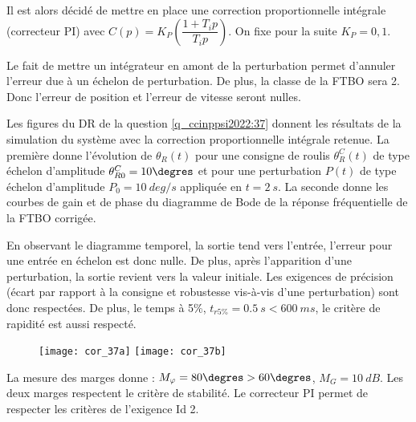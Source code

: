 Il est alors décidé de mettre en place une correction proportionnelle intégrale (correcteur PI)
avec $C(p) = K_P\left(\dfrac{1+T_i p}{T_i p}\right)$. On fixe pour la suite $K_P = 0,1$.

\ifprof
\begin{corrige}
Le fait de mettre un intégrateur en amont de la perturbation permet d’annuler l’erreur due à un échelon de perturbation.
De plus, la classe de la FTBO sera 2. Donc l’erreur de position et l’erreur de vitesse seront nulles.

\end{corrige}
\else
\fi

Les figures du DR de la question \ref{q_ccinppsi2022:37} donnent les résultats de la simulation du système avec la
correction proportionnelle intégrale retenue. La première donne l’évolution de $\theta_R(t)$ pour une
consigne de roulis $\theta_R^C(t)$ de type échelon d’amplitude $\theta_{R0}^C = 10\degres$ et pour une perturbation $P(t)$ de
type échelon d’amplitude $P_0 =\SI{10}{deg/s}$ appliquée en $t = \SI{2}{s}$. La seconde donne les courbes
de gain et de phase du diagramme de Bode de la réponse fréquentielle de la FTBO corrigée.

\ifprof
\begin{corrige}
En observant le diagramme temporel, la sortie tend vers l’entrée, l’erreur pour une entrée en échelon est donc nulle. De plus, après l’apparition d’une perturbation, la sortie revient vers la valeur initiale.
Les exigences de précision (écart par rapport à la consigne et robustesse vis-à-vis d’une perturbation) sont donc respectées.
De plus, le temps à 5\%, $t_{r5\%}=\SI{0,5}{s}<\SI{600}{ms}$, le critère de rapidité est aussi respecté.


\begin{figure}[H]
\centering
\texttt{[image: cor\_37a]}
\hfill
\texttt{[image: cor\_37b]}
\end{figure}

La mesure des marges donne : 
$M_{\varphi}=80\degres >60 \degres$, $M_G=\SI{10}{dB}$.
Les deux marges respectent le critère de stabilité.
Le correcteur PI permet de respecter les critères de l’exigence Id 2.


\end{corrige}
\else
\fi

